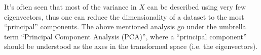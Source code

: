 It's often seen that most of the variance in $X$ can be described using very few eigenvectors, thus one can reduce the dimensionality of a dataset to the most ``principal'' components.
The above mentioned analysis go under the umbrella term ``Principal Component Analysis (PCA)'', where a ``principal component'' should be understood as the axes in the transformed space (i.e. the eigenvectors).
